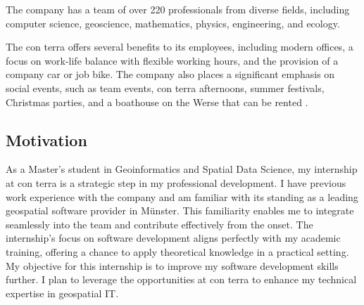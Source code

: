 \documentclass[11pt, titlepage, a4paper]{article}
\begin{document}
The company has a team of over 220 professionals from diverse fields, including computer science, geoscience, mathematics, physics, engineering, and ecology. %




The con terra offers several benefits to its employees, including modern offices, a focus on work-life balance with flexible working hours, and the provision of a company car or job bike. The company also places a significant emphasis on social events, such as team events, con terra afternoons, summer festivals, Christmas parties, and a boathouse on the Werse that can be rented \cite{conterraUnternehmensubersicht2024}.





\subsection{Motivation}
As a Master's student in Geoinformatics and Spatial Data Science, my internship at con terra is a strategic step in my professional development. I have previous work experience with the company and am familiar with its standing as a leading geospatial software provider in Münster. This familiarity enables me to integrate seamlessly into the team and contribute effectively from the onset. The internship's focus on software development aligns perfectly with my academic training, offering a chance to apply theoretical knowledge in a practical setting. My objective for this internship is to improve my software development skills further. I plan to leverage the opportunities at con terra to enhance my technical expertise in geospatial IT.
\end{document}
